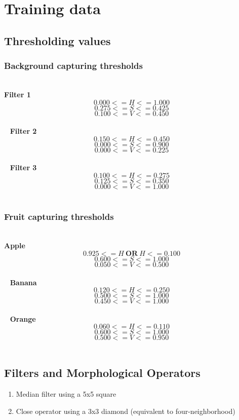 \documentclass{article}
\begin{document}
\section{Training data}
\subsection{Thresholding values}
\label{subsec:process:filters}
\subsubsection{Background capturing thresholds}
\label{subsubsec:process:filters:background}
~\\
\textbf{Filter 1}
\[0.000 <= H <= 1.000\]
\[0.275 <= S <= 0.425\]
\[0.100 <= V <= 0.450\]\\
~
\textbf{Filter 2}
\[0.150 <= H <= 0.450\]
\[0.000 <= S <= 0.900\]
\[0.000 <= V <= 0.225\]\\
~
\textbf{Filter 3}
\[0.100 <= H <= 0.275\]
\[0.125 <= S <= 0.350\]
\[0.000 <= V <= 1.000\]\\

\subsubsection{Fruit capturing thresholds}
\label{subsubsec:process:filters:fruit}
~\\
\textbf{Apple}
\[0.925 <= H\ \textbf{OR}\ H <= 0.100\]
\[0.600 <= S <= 1.000\]
\[0.050 <= V <= 0.500\]\\
~
\textbf{Banana}
\[0.120 <= H <= 0.250\]
\[0.500 <= S <= 1.000\]
\[0.450 <= V <= 1.000\]\\
~
\textbf{Orange}
\[0.060 <= H <= 0.110\]
\[0.600 <= S <= 1.000\]
\[0.500 <= V <= 0.950\]\\

\subsection{Filters and Morphological Operators}
\label{subsec:process:filtmorph}
\begin{enumerate}
\item Median filter using a 5x5 square
\item Close operator using a 3x3 diamond (equivalent to four-neighborhood)
\end{enumerate}
\end{document}
